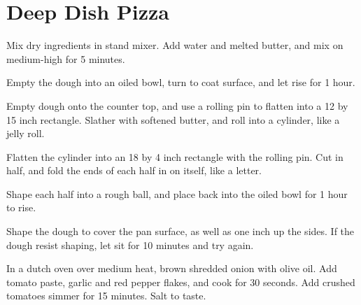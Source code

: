 \section{Deep Dish Pizza}
\begin{recipe}



Mix dry ingredients in stand mixer. Add water and melted butter, and mix on medium-high for 5 minutes.

Empty the dough into an oiled bowl, turn to coat surface, and let rise for 1 hour.

Empty dough onto the counter top, and use a rolling pin to flatten into a 12 by 15 inch rectangle. Slather with softened butter, and roll into a cylinder, like a jelly roll.

Flatten the cylinder into an 18 by 4 inch rectangle with the rolling pin. Cut in half, and fold the ends of each half in on itself, like a letter.

Shape each half into a rough ball, and place back into the oiled bowl for 1 hour to rise.

Shape the dough to cover the pan surface, as well as one inch up the sides. If the dough resist shaping, let sit for 10 minutes and try again.


In a dutch oven over medium heat, brown shredded onion with olive oil. Add tomato paste, garlic and red pepper flakes, and cook for 30 seconds. Add crushed tomatoes simmer for 15 minutes. Salt to taste.


\end{recipe}

